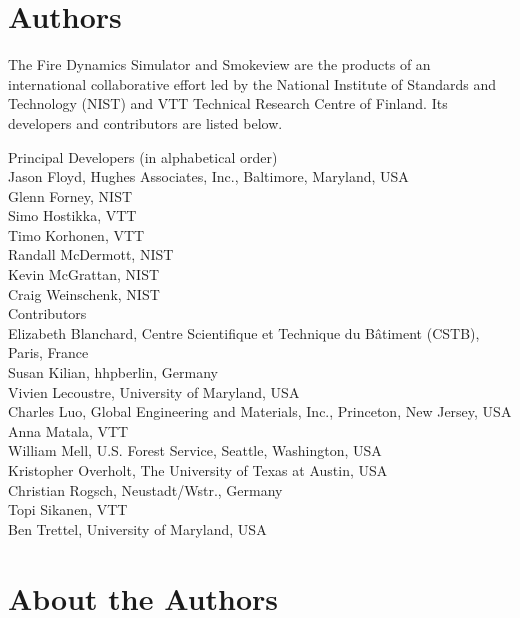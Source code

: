 \chapter{Authors}

The Fire Dynamics Simulator and Smokeview are the products of an international collaborative effort led by
the National Institute of Standards and Technology (NIST) and VTT Technical Research Centre of Finland. Its developers and
contributors are listed below.

\vspace{0.5in}

\begin{flushleft}

Principal Developers (in alphabetical order) \\ [0.2in]

Jason Floyd, Hughes Associates, Inc., Baltimore, Maryland, USA \\
Glenn Forney, NIST \\
Simo Hostikka, VTT \\
Timo Korhonen, VTT  \\
Randall McDermott, NIST \\
Kevin McGrattan, NIST \\
Craig Weinschenk, NIST \\ [0.5in]

Contributors \\ [0.2in]

Elizabeth Blanchard, Centre Scientifique et Technique du B\^{a}timent (CSTB), Paris, France \\
Susan Kilian, hhpberlin, Germany \\
Vivien Lecoustre, University of Maryland, USA \\
Charles Luo, Global Engineering and Materials, Inc., Princeton, New Jersey, USA \\
Anna Matala, VTT \\
William Mell, U.S. Forest Service, Seattle, Washington, USA \\
Kristopher Overholt, The University of Texas at Austin, USA \\
Christian Rogsch, Neustadt/Wstr., Germany \\
Topi Sikanen, VTT \\
Ben Trettel, University of Maryland, USA

\end{flushleft}


\chapter{About the Authors}

